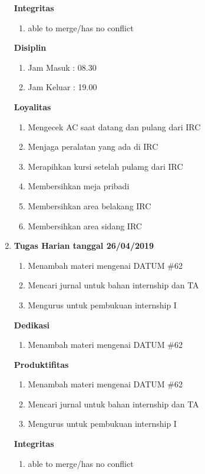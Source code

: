 \begin{enumerate}
\textbf{Integritas}
\begin{enumerate}
\item able to merge/has no conflict
\end{enumerate}

\textbf{Disiplin}
\begin{enumerate}
\item Jam Masuk : 08.30
\item Jam Keluar : 19.00
\end{enumerate}

\textbf{Loyalitas}
\begin{enumerate}
\item Mengecek AC saat datang dan pulang dari IRC
\item Menjaga peralatan yang ada di IRC
\item Merapihkan kursi setelah pulamg dari IRC
\item Membersihkan meja pribadi
\item Membersihkan area belakang IRC
\item Membersihkan area sidang IRC
\end{enumerate}


\item \textbf{Tugas Harian tanggal 26/04/2019}
\begin{enumerate}
\item Menambah materi mengenai DATUM \#62
\item Mencari jurnal untuk bahan internship dan TA
\item Mengurus untuk pembukuan internship I 
\end{enumerate}

\textbf{Dedikasi}
\begin{enumerate}
\item Menambah materi mengenai DATUM \#62
\end{enumerate}

\textbf{Produktifitas}
\begin{enumerate}
\item Menambah materi mengenai DATUM \#62
\item Mencari jurnal untuk bahan internship dan TA
\item Mengurus untuk pembukuan internship I 
\end{enumerate}

\textbf{Integritas}
\begin{enumerate}
\item able to merge/has no conflict
\end{enumerate}


\end{enumerate}
